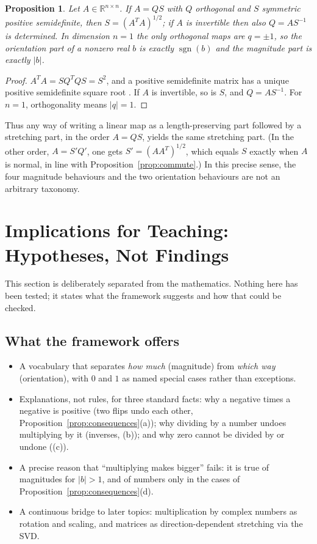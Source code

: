 \documentclass[12pt]{article}
\newtheorem{proposition}[theorem]{Proposition}
\theoremstyle{definition}
\theoremstyle{remark}
\newcommand{\R}{\mathbb{R}}
\newcommand{\sgn}{\operatorname{sgn}}
\begin{document}
\begin{proposition}\label{prop:unique}
Let $A\in\R^{n\times n}$. If $A=QS$ with $Q$ orthogonal and $S$ symmetric positive semidefinite, then $S=(A^TA)^{1/2}$; if $A$ is invertible then also $Q=AS^{-1}$ is determined. In dimension $n=1$ the only orthogonal maps are $q=\pm1$, so the orientation part of a nonzero real $b$ is exactly $\sgn(b)$ and the magnitude part is exactly $|b|$.
\end{proposition}
\begin{proof}
$A^TA=SQ^TQS=S^2$, and a positive semidefinite matrix has a unique positive semidefinite square root \cite{horn2013}. If $A$ is invertible, so is $S$, and $Q=AS^{-1}$. For $n=1$, orthogonality means $|q|=1$.
\end{proof}
Thus any way of writing a linear map as a length-preserving part followed by a stretching part, in the order $A=QS$, yields the same stretching part. (In the other order, $A=S'Q'$, one gets $S'=(AA^T)^{1/2}$, which equals $S$ exactly when $A$ is normal, in line with Proposition~\ref{prop:commute}.) In this precise sense, the four magnitude behaviours and the two orientation behaviours are not an arbitrary taxonomy.

\section{Implications for Teaching: Hypotheses, Not Findings}\label{sec:teaching}
This section is deliberately separated from the mathematics. Nothing here has been tested; it states what the framework suggests and how that could be checked.

\subsection{What the framework offers}
\begin{itemize}
\item A vocabulary that separates \emph{how much} (magnitude) from \emph{which way} (orientation), with $0$ and $1$ as named special cases rather than exceptions.
\item Explanations, not rules, for three standard facts: why a negative times a negative is positive (two flips undo each other, Proposition~\ref{prop:consequences}(a)); why dividing by a number undoes multiplying by it (inverses, (b)); and why zero cannot be divided by or undone ((c)).
\item A precise reason that ``multiplying makes bigger'' fails: it is true of magnitudes for $|b|>1$, and of numbers only in the cases of Proposition~\ref{prop:consequences}(d).
\item A continuous bridge to later topics: multiplication by complex numbers as rotation and scaling, and matrices as direction-dependent stretching via the SVD.
\end{itemize}
\end{document}
